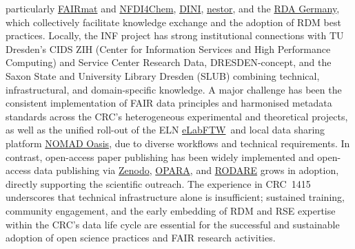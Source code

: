 \documentclass{eceasst}
\newcommand{\elabftw}{\href{https://www.elabftw.net/}{eLabFTW}}
\begin{document}
 particularly \href{https://www.fairmat-nfdi.eu/}{FAIRmat} and \href{https://nfdi4chem.de/}{NFDI4Chem}, \href{https://dini.de/}{DINI}, \href{https://www.langzeitarchivierung.de}{nestor}, and the \href{https://www.rda-deutschland.de/}{RDA Germany},
which collectively facilitate knowledge exchange and the adoption of RDM best practices.
Locally, the INF project has strong institutional connections with TU Dresden’s CIDS ZIH (Center for Information Services and High Performance Computing)
and Service Center Research Data, DRESDEN-concept, and the Saxon State and University Library Dresden (SLUB)
combining technical, infrastructural, and domain-specific knowledge.
A major challenge has been the consistent implementation of FAIR data principles and harmonised metadata standards across the CRC’s heterogeneous experimental and theoretical projects,
as well as the unified roll-out of the ELN \elabftw ~and local data sharing platform \href{https://nomad-lab.eu/nomad-lab/nomad-oasis.html}{NOMAD Oasis}, due to diverse workflows and technical requirements.
In contrast, open-access paper publishing has been widely implemented and open-access data publishing via \href{https://zenodo.org/communities/crc1415/about}{Zenodo}, \href{https://opara.zih.tu-dresden.de/home}{OPARA}, and \href{https://rodare.hzdr.de/communities/crc1415}{RODARE} grows in adoption,
directly supporting the scientific outreach.
The experience in CRC~1415 underscores that technical infrastructure alone is insufficient; sustained training, community engagement, and the early embedding of RDM and RSE expertise within the CRC’s data life cycle are essential for the successful and sustainable adoption of open science practices and FAIR research activities.
\end{document}
